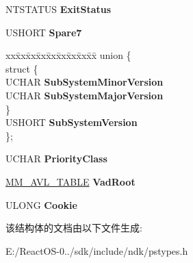 \begin{DoxyCompactItemize}
\begin{tabbing}
\end{tabbing}\item 
\mbox{\label{struct___e_p_r_o_c_e_s_s_a368bb127aee291cbf4ebffe529b1df1b}} 
N\+T\+S\+T\+A\+T\+US {\bfseries Exit\+Status}
\item 
\mbox{\label{struct___e_p_r_o_c_e_s_s_a0802b24c8261c693f996a777dd3ef1b3}} 
U\+S\+H\+O\+RT {\bfseries Spare7}
\item 
\mbox{\label{struct___e_p_r_o_c_e_s_s_a986cb59ab3b44c78db8e9b68d003de06}} 
\begin{tabbing}
xx\=xx\=xx\=xx\=xx\=xx\=xx\=xx\=xx\=\kill
union \{\\
\mbox{\label{union___e_p_r_o_c_e_s_s_1_1_0D2237_a80c7d1e261aca31e476d5f6a228861a2}} 
\>struct \{\\
\>\>UCHAR {\bfseries SubSystemMinorVersion}\\
\>\>UCHAR {\bfseries SubSystemMajorVersion}\\
\>\} \\
\>USHORT {\bfseries SubSystemVersion}\\
\}; \\

\end{tabbing}\item 
\mbox{\label{struct___e_p_r_o_c_e_s_s_ab78776ba8f63b8bd5c9df0dca149b428}} 
U\+C\+H\+AR {\bfseries Priority\+Class}
\item 
\mbox{\label{struct___e_p_r_o_c_e_s_s_a187fc4265670e16f4b4a45283d485371}} 
\hyperlink{struct___m_m___a_v_l___t_a_b_l_e}{M\+M\+\_\+\+A\+V\+L\+\_\+\+T\+A\+B\+LE} {\bfseries Vad\+Root}
\item 
\mbox{\label{struct___e_p_r_o_c_e_s_s_ae7a25cb3c0b78e82fb29873c19adc8df}} 
U\+L\+O\+NG {\bfseries Cookie}
\end{DoxyCompactItemize}


该结构体的文档由以下文件生成\+:\begin{DoxyCompactItemize}
\item 
E\+:/\+React\+O\+S-\/0../sdk/include/ndk/pstypes.\+h\end{DoxyCompactItemize}
